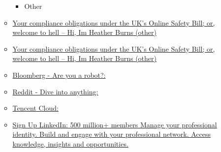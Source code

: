 \begin{itemize}
\begin{itemize}
\begin{itemize}
    \item
      Other
    \end{itemize}
  \item
    \href{https://webdevlaw.uk/2022/07/11/your-compliance-obligations-under-the-uks-online-safety-bill/}{Your
    compliance obligations under the UK's Online Safety Bill; or,
    welcome to hell -- Hi, I\textquotesingle m Heather Burns (other)}
  \item
    \href{https://webdevlaw.uk/2022/07/11/your-compliance-obligations-under-the-uks-online-safety-bill/}{Your
    compliance obligations under the UK's Online Safety Bill; or,
    welcome to hell -- Hi, I\textquotesingle m Heather Burns (other)}
  \item
    \href{https://www.bloomberg.com/news/articles/2023-02-21/amazon-s-aws-joins-with-ai-startup-hugging-face-as-chatgpt-competition-heats-up}{Bloomberg
    - Are you a robot?:}
  \item
    \href{https://www.reddit.com/r/CryptoCurrency/comments/10wx51p/the_current_list_of_cbdcs_in_development_around/}{Reddit
    - Dive into anything:}
  \item
    \href{https://www.tencentcloud.com/dynamic/news-details/100437?lang=en\&pg=}{Tencent
    Cloud:}
  \item
    \href{https://www.linkedin.com/posts/activity-7046131519802757120-uUEf?utm_source=share\&utm_medium=member_android}{Sign
    Up \textbar{} LinkedIn: 500 million+ members \textbar{} Manage your
    professional identity. Build and engage with your professional
    network. Access knowledge, insights and opportunities.}

    \begin{itemize}
     

\end{itemize}
\end{itemize}
\end{itemize}
